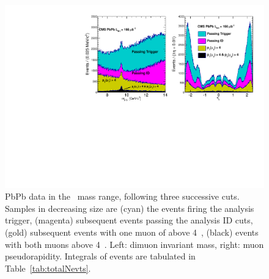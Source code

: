 \begin{figure}[h]
\begin{center}
\includegraphics[width=\textwidth]{Chapters/aYield/noCuts_pt4.pdf}
\caption{PbPb data in the \PgU\ mass range, following three
  successive cuts. Samples in decreasing size are (cyan) the events
  firing the analysis trigger, (magenta) subsequent events passing the analysis
  ID cuts, (gold) subsequent events with one muon  of \pt above 4~\GeVc, (black) events with both muons above 4~\GeVc. Left: dimuon invariant mass, right: muon pseudorapidity. Integrals of events are tabulated in Table~\ref{tab:totalNevts}.}
\label{fig:HIdata2011}
\end{center}
\end{figure}

